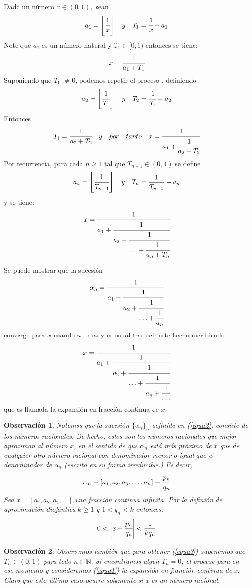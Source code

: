\documentclass[12pt]{report}
\newtheorem{obs}{{Observación}}[section]
\begin{document}
Dado un número $x \in(0,1),$ sean
\[
a_{1}=\left\lfloor\cfrac{1}{x}\right\rfloor \quad y \quad T_{1}=\cfrac{1}{x}-a_{1}
\]
Note que $a_{1}$ es un número natural y $T_{1} \in[0,1)$ entonces se tiene:
\[
x=\cfrac{1}{a_{1}+T_{1}}
\]
Suponiendo que $T_{1}$ $\neq 0$, podemos repetir el proceso , definiendo
\[
a_{2}=\left\lfloor\cfrac{1}{T_{1}}\right\rfloor \quad y \quad T_{2}=\cfrac{1}{T_{1}}-a_{2}
\]
Entonces 
\[
T_{1}=\cfrac{1}{a_{2}+T_{2}} \quad y \quad por \quad tanto \quad x=\cfrac{1}{a_{1}+\cfrac{1}{a_{2}+T_{2}}}
\]
Por recurrencia, para cada $n \geqslant 1$ tal que $T_{n-1} \in(0,1)$ se define
\[
a_{n}=\left\lfloor\cfrac{1}{T_{n-1}}\right\rfloor \quad y \quad T_{n}=\frac{1}{T_{n-1}}-a_{n}
\]
y se tiene: 
\begin{equation}
    x=\cfrac{1}{a_{1}+\cfrac{1}{a_{2}+\cfrac{1}{\ldots+\cfrac{1}{a_{n}+
    T_{n}}}}}
    \label{equa1}
\end{equation}

Se puede mostrar que la sucesión
\begin{equation}
    \alpha_{n} = \cfrac{1}{a_{1}+\cfrac{1}{a_{2}+\cfrac{1}{\ldots+\cfrac{1}{a_{n}}}}}
    \label{equa2}
\end{equation}
converge para $x$ cuando $n\to\infty$ y es usual traducir este hecho escribiendo
\begin{equation}
    x=\cfrac{1}{a_{1}+\cfrac{1}{a_{2}+\cfrac{1}{\ldots+\cfrac{1}{a_{n}+\cfrac{1}{\ldots}}}}}
    \label{equa3}
\end{equation}
que es llamada la expansión en fracción continua de $x$.

\begin{obs}
Notemos que la sucesión $\{\alpha_{n}\}_{n}$ definida en (\ref{equa2}) consiste de los números racionales. De hecho, estos son los números racionales que mejor aproximan al número $x$, en el sentido de que $\alpha_{n}$ está más próximo de $x$ que de cualquier otro número racional con denominador menor o igual que el denominador de $\alpha_{n}$ (escrito en su forma irreducible.)
Es decir,
$$
\alpha_{n}=[a_{1},a_{2},a_{3},\ldots,a_{n}]=\cfrac{p_{n}}{q_{n}}
$$
Sea $x=[a_{1},a_{2},a_{3},\ldots]$ una fracción continua infinita. Por la definión de aproximación diofántica $k\geq1$ y $1<q_{n}<k$ entonces:
$$
0<\left|x-\cfrac{p_{n}}{q_{n}}\right|<\frac{1}{kq_{n}}
$$
\end{obs}

\begin{obs}
Observemos también que para obtener (\ref{equa3}) suponemos que $T_{n}\in (0,1)$ para todo $n\in\mathbb{N}.$ Si encontramos algún $T_{n}=0$, el proceso para en ese momento y consideramos (\ref{equa1}) la expansión en franción continua de x. Claro que esto último caso ocurre solamente si x es un número racional.
\end{obs}
\end{document}
